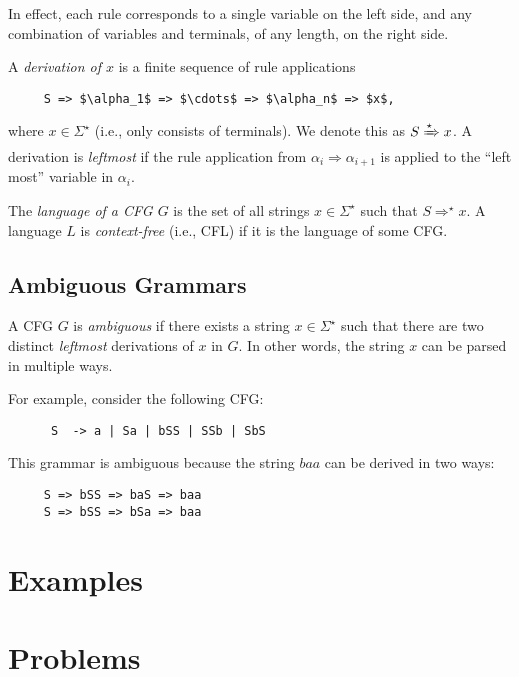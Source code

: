 In effect, each rule corresponds to a single variable on the left side, and any combination of variables and terminals, of any length, on the right side.

A \emph{derivation of $x$} is a finite sequence of rule applications
\begin{lstlisting}
	 S => $\alpha_1$ => $\cdots$ => $\alpha_n$ => $x$,
\end{lstlisting}
where $x \in \Sigma^\star$ (i.e., only consists of terminals).
We denote this as $S \xRightarrow{\star}x$.
A derivation is \emph{leftmost} if the rule application from $\alpha_i \Rightarrow \alpha_{i+1}$ is applied to the ``left most'' variable in $\alpha_i$.

The \emph{language of a CFG $G$} is the set of all strings $x \in \Sigma^\star$ such that $S \Rightarrow^\star x$.
A language $L$ is \emph{context-free} (i.e., CFL) if it is the language of some CFG.

\subsection{Ambiguous Grammars}

A CFG $G$ is \emph{ambiguous} if there exists a string $x \in \Sigma^\star$ such that there are two distinct \emph{leftmost} derivations of $x$ in $G$.
In other words, the string $x$ can be parsed in multiple ways. 

For example, consider the following CFG:
\begin{lstlisting}
	  S  -> a | Sa | bSS | SSb | SbS
\end{lstlisting}

This grammar is ambiguous because the string $baa$ can be derived in two ways:
\begin{lstlisting}
	 S => bSS => baS => baa
	 S => bSS => bSa => baa
\end{lstlisting}

\section{Examples}

\section{Problems}

